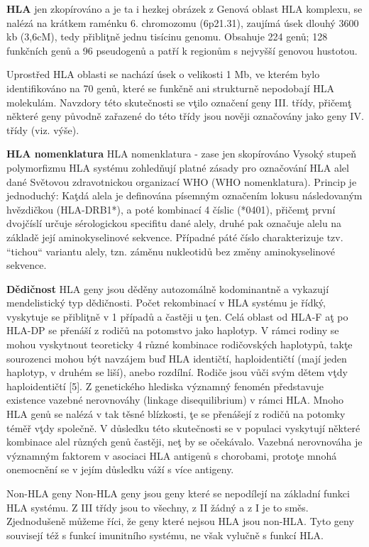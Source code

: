\documentclass[czech,DP]{thesiskiv}
\begin{document}
\textbf{HLA}
jen zkopírováno a je ta i hezkej obrázek z %
Genová oblast HLA komplexu, se nalézá na krátkem raménku 6. chromozomu (6p21.31), zaujímá úsek dlouhý 3600 kb
(3,6cM), tedy přibliţně jednu tisícinu genomu. Obsahuje 224 genů; 128 funkčních genů
a 96 pseudogenů a patří k regionům s nejvyšší genovou hustotou.

Uprostřed HLA oblasti se nachází úsek o velikosti 1 Mb, ve kterém bylo identifikováno na
70 genů, které se funkčně ani strukturně nepodobají HLA molekulám. Navzdory této
skutečnosti se vţilo označení geny III. třídy, přičemţ některé geny původně zařazené do
této třídy jsou nověji označovány jako geny IV. třídy (viz. výše).

\textbf{HLA nomenklatura}
HLA nomenklatura - zase jen skopírováno
Vysoký stupeň polymorfizmu HLA systému zohledňují platné zásady pro označování HLA
alel dané Světovou zdravotnickou organizací WHO (WHO nomenklatura). Princip je
jednoduchý: Kaţdá alela je definována písemným označením lokusu následovaným
hvězdičkou (HLA-DRB1*), a poté kombinací 4 číslic (*0401), přičemţ první dvojčíslí
určuje sérologickou specifitu dané alely, druhé pak označuje alelu na základě její
aminokyselinové sekvence. Případné páté číslo charakterizuje tzv. “tichou“ variantu alely,
tzn. záměnu nukleotidů bez změny aminokyselinové sekvence.

\textbf{Dědičnost}
HLA geny jsou děděny autozomálně kodominantně a vykazují mendelistický typ
dědičnosti. Počet rekombinací v HLA systému je řídký, vyskytuje se přibliţně v 1 %
případů a častěji u ţen. Celá oblast od HLA-F aţ po HLA-DP se přenáší z rodičů na
potomstvo jako haplotyp. V rámci rodiny se mohou vyskytnout teoreticky 4 různé
kombinace rodičovských haplotypů, takţe sourozenci mohou být navzájem buď HLA
identičtí, haploidentičtí (mají jeden haplotyp, v druhém se liší), anebo rozdílní. Rodiče jsou
vůči svým dětem vţdy haploidentičtí [5]. Z genetického hlediska významný fenomén
představuje existence vazebné nerovnováhy (linkage disequilibrium) v rámci HLA. Mnoho
HLA genů se nalézá v tak těsné blízkosti, ţe se přenášejí z rodičů na potomky téměř vţdy
společně. V důsledku této skutečnosti se v populaci vyskytují některé kombinace alel
různých genů častěji, neţ by se očekávalo. Vazebná nerovnováha je významným faktorem
v asociaci HLA antigenů s chorobami, protoţe mnohá onemocnění se v jejím důsledku
váží s více antigeny.

Non-HLA geny
Non-HLA geny jsou geny které se nepodílejí na základní funkci HLA systému. Z III třídy jsou to všechny, z II žádný a z I je to směs. Zjednodušeně můžeme říci, že geny které nejsou HLA jsou non-HLA. Tyto geny souvisejí též s funkcí imunitního systému, ne však vylučně s funkcí HLA. 
\end{document}
